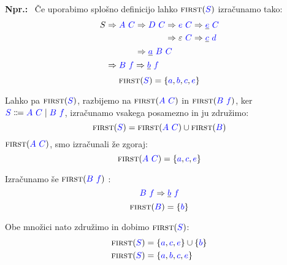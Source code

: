\documentclass{article}
\newcommand{\Ex}{\textbf{Npr.:}\ }
\newcommand{\FIRST}{\textsc{first}}
\newcommand{\Symbol}[1]{\textcolor{blue}{#1}}
\newcommand{\Null}{\varepsilon}
\newcommand{\Arrow}{\Coloneq}
\newcommand{\Derive}{\Rightarrow}
\newcommand{\Seq}{\ }
\newcommand{\Union}{\mathrel{|}}
\begin{document}
\Ex
Če uporabimo splošno definicijo lahko $\FIRST(\Symbol{S})$ izračunamo tako:
\begin{equation*}
  S \begin{aligned}[t]
    &\Derive \Symbol{A} \Seq \Symbol{C} \begin{aligned}[t]
      &\Derive \Symbol{D} \Seq \Symbol{C} \begin{aligned}[t]
        &\Derive \Symbol{e} \Seq \Symbol{C} \Derive \underline{\Symbol{e}} \Seq \Symbol{C} \\
        &\Derive \Null \Seq \Symbol{C} \Derive \underline{\Symbol{c}} \Seq \Symbol{d} \\
      \end{aligned}\\
      &\Derive \underline{\Symbol{a}} \Seq \Symbol{B} \Seq \Symbol{C}
    \end{aligned}\\
    &\Derive \Symbol{B} \Seq \Symbol{f} \Derive \underline{\Symbol{b}} \Seq \Symbol{f}
  \end{aligned}
\end{equation*}
\begin{equation*}
  \FIRST(\Symbol{S}) = \{\Symbol{a}, \Symbol{b}, \Symbol{c}, \Symbol{e}\}
\end{equation*}

Lahko pa $\FIRST(\Symbol{S})$, razbijemo na $\FIRST(\Symbol{A} \Seq \Symbol{C})$ in $\FIRST(\Symbol{B} \Seq \Symbol{f})$, ker $\Symbol{S} \Arrow \Symbol{A} \Seq \Symbol{C} \Union \Symbol{B} \Seq \Symbol{f}$, izračunamo vsakega posamezno in ju združimo:
\begin{equation*}
  \FIRST(\Symbol{S}) = \FIRST(\Symbol{A} \Seq \Symbol{C}) \cup \FIRST(\Symbol{B})
\end{equation*}
$\FIRST(\Symbol{A} \Seq \Symbol{C})$, smo izračunali že zgoraj:
\begin{equation*}
  \FIRST(\Symbol{A} \Seq \Symbol{C}) = \{\Symbol{a}, \Symbol{c}, \Symbol{e}\}
\end{equation*}

Izračunamo še $\FIRST(\Symbol{B} \Seq \Symbol{f})$ :
\begin{equation*}
  \Symbol{B} \Seq \Symbol{f} \Derive \underline{\Symbol{b}} \Seq \Symbol{f}
\end{equation*}
\begin{equation*}
  \FIRST(\Symbol{B}) = \{\Symbol{b}\}
\end{equation*}

Obe množici nato združimo in dobimo $\FIRST(\Symbol{S})$:
\begin{align*}
  \FIRST(\Symbol{S}) &= \{\Symbol{a}, \Symbol{c}, \Symbol{e}\} \cup \{\Symbol{b}\}\\
  \FIRST(\Symbol{S}) &= \{\Symbol{a}, \Symbol{b}, \Symbol{c}, \Symbol{e}\}
\end{align*}
\end{document}
